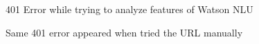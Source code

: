 \begin{itemize}
\begin {figure}[h!h]
        \caption{401 Error while trying to analyze features of Watson \acs{NLU}}
        \label{ibm401error}
    \end {figure}
    \begin {figure}[h!h]
        \centering
        \caption{Same 401 error appeared when tried the URL manually}
        \label{ibm401error1}
    \end {figure}
\end{itemize}

